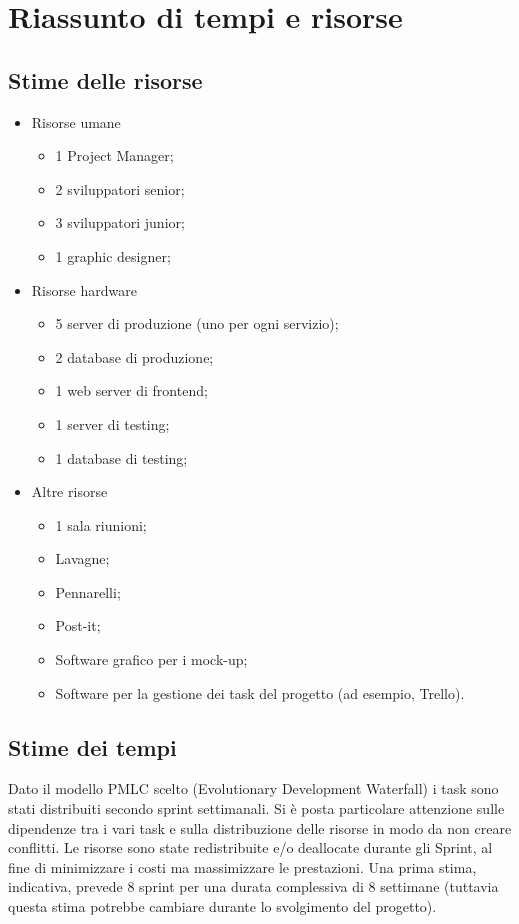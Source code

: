 \documentclass{article}
\begin{document}
  \newpage
  \section{Riassunto di tempi e risorse}

  \subsection{Stime delle risorse}
  \begin{itemize}
    \item Risorse umane
    \begin{itemize}
      \item 1 Project Manager;
      \item 2 sviluppatori senior;
      \item 3 sviluppatori junior;
      \item 1 graphic designer;
    \end{itemize}
    \item Risorse hardware
    \begin{itemize}
      \item 5 server di produzione (uno per ogni servizio);
      \item 2 database di produzione;
      \item 1 web server di frontend;
      \item 1 server di testing;
      \item 1 database di testing;
    \end{itemize}
    \item Altre risorse
    \begin{itemize}
      \item 1 sala riunioni;
      \item Lavagne;
      \item Pennarelli;
      \item Post-it;
      \item Software grafico per i mock-up;
      \item Software per la gestione dei task del progetto (ad esempio, Trello).
    \end{itemize}
  \end{itemize}

  \subsection{Stime dei tempi}

  Dato il modello PMLC scelto (Evolutionary Development Waterfall) i task sono stati distribuiti secondo sprint
    settimanali. Si è posta particolare attenzione sulle dipendenze tra i vari task e sulla distribuzione delle 
    risorse in modo da non creare conflitti.
    Le risorse sono state redistribuite e/o deallocate durante gli Sprint, al fine di minimizzare i costi 
    ma massimizzare le prestazioni.
    Una prima stima, indicativa, prevede 8 sprint per una durata complessiva di 8 settimane 
    (tuttavia questa stima potrebbe cambiare durante lo svolgimento del progetto). 
\end{document}
